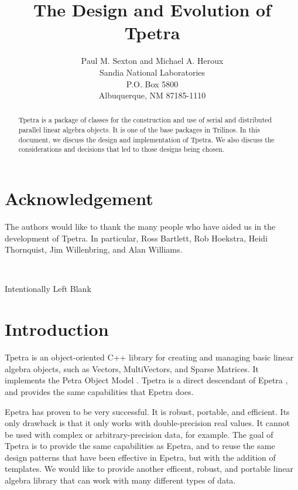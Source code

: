 \documentclass[10pt,relax]{TpetraDesign}
\title{The Design and Evolution of Tpetra}
\author{Paul M. Sexton and Michael A. Heroux \\
       Sandia National Laboratories\\
       P.O. Box 5800\\
       Albuquerque, NM 87185-1110
     }
\date{}
\begin{document}
\maketitle

\begin{abstract}
Tpetra is a package of classes for the construction and use of serial and distributed 
parallel linear algebra objects. It is one of the base packages in Trilinos. In this 
document, we discuss the design and implementation of Tpetra. We also
discuss the considerations and decisions that led to those designs being chosen.
\end{abstract}

\clearpage
\section*{Acknowledgement}
The authors would like to thank the many people who have aided us in the
development of Tpetra. In particular, Ross Bartlett, Rob Hoekstra, 
Heidi Thornquist, Jim Willenbring, and Alan Williams.

\clearpage
\tableofcontents

\newpage
\
\vspace{3.5in}
\begin{center}Intentionally Left Blank\end{center}

\newpage

%
\section{Introduction}

Tpetra is an object-oriented C++ library for creating and managing basic linear algebra objects, such as Vectors, MultiVectors, and Sparse Matrices. It implements the Petra Object Model \cite{Petra-Object-Model}. Tpetra is a direct descendant of Epetra \cite{Epetra}, and provides the same capabilities that Epetra does. 

Epetra has proven to be very successful. It is robust, portable, and efficient. Its only drawback is that it only works with double-precision real values. It cannot be used with complex or arbitrary-precision data, for example. The goal of Tpetra is to provide the same capabilities as Epetra, and to reuse the same design patterns that have been effective in Epetra, but with the addition of templates. We would like to provide another efficent, robust, and portable linear algebra library that can work with many different types of data. 
\end{document}
